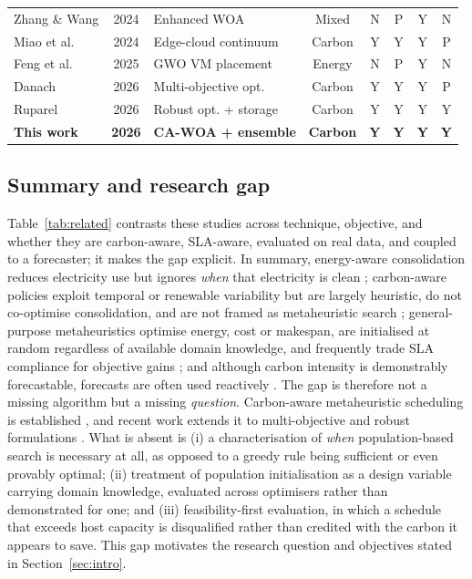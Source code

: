 \documentclass[12pt,a4paper]{article}
\begin{document}
\begin{table}[H]
\begin{tabular}{@{}p{2.35cm}cp{1.9cm}ccccc@{}}
Zhang \& Wang \cite{zhang2024ewoa} & 2024 & Enhanced WOA & Mixed & N & P & Y & N \\
Miao et al. \cite{miao2024energy} & 2024 & Edge-cloud continuum & Carbon & Y & Y & Y & P \\
Feng et al. \cite{feng2025gwo} & 2025 & GWO VM placement & Energy & N & P & Y & N \\
Danach \cite{danach2026carbon} & 2026 & Multi-objective opt. & Carbon & Y & Y & Y & P \\
Ruparel \cite{ruparel2026carbon} & 2026 & Robust opt. + storage & Carbon & Y & Y & Y & Y \\
\midrule
\textbf{This work} & \textbf{2026} & \textbf{CA-WOA + ensemble} & \textbf{Carbon} & \textbf{Y} & \textbf{Y} & \textbf{Y} & \textbf{Y} \\
\bottomrule
\end{tabular}
\end{table}

\subsection{Summary and research gap}
Table~\ref{tab:related} contrasts these studies across technique, objective, and whether they are
carbon-aware, SLA-aware, evaluated on real data, and coupled to a forecaster; it makes the gap explicit. In
summary, energy-aware consolidation reduces electricity use but ignores \emph{when} that electricity is
clean \cite{beloglazov2012optimal, beloglazov2012energy}; carbon-aware policies exploit temporal or renewable
variability but are largely heuristic, do not co-optimise consolidation, and are not framed as metaheuristic
search \cite{goiri2011greenslot, wiesner2021lets, radovanovic2023carbon}; general-purpose metaheuristics
optimise energy, cost or makespan, are initialised at random regardless of available domain knowledge, and
frequently trade SLA compliance for objective gains \cite{kalra2015review, mirjalili2016whale,
heidari2019harris}; and although carbon intensity is demonstrably forecastable, forecasts are often used
reactively \cite{leerbeck2020short, maji2022carboncast}.
The gap is therefore not a missing algorithm but a missing \emph{question}. Carbon-aware metaheuristic
scheduling is established \cite{abbasikhazaei2022energy, khodayarseresht2023energy, miao2024energy}, and
recent work extends it to multi-objective and robust formulations \cite{danach2026carbon, ruparel2026carbon}.
What is absent is (i) a characterisation of \emph{when} population-based search is necessary at all, as
opposed to a greedy rule being sufficient or even provably optimal; (ii) treatment of population
initialisation as a design variable carrying domain knowledge, evaluated across optimisers rather than
demonstrated for one; and (iii) feasibility-first evaluation, in which a schedule that exceeds host capacity is
disqualified rather than credited with the carbon it appears to save. This gap motivates the research question
and objectives stated in Section~\ref{sec:intro}.
\end{document}
